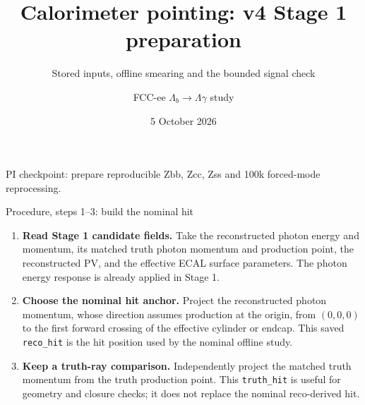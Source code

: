 \documentclass[aspectratio=169,10pt]{beamer}
\title[Photon pointing v4]{Calorimeter pointing: v4 Stage 1 preparation}
\subtitle{Stored inputs, offline smearing and the bounded signal check}
\author{FCC-ee $\Lambda_b\to\Lambda\gamma$ study}
\date{5 October 2026}
\begin{document}
\begin{frame}\titlepage
\vspace{-0.4cm}\centering\small PI checkpoint: prepare reproducible Zbb, Zcc, Zss and 100k forced-mode reprocessing.
\end{frame}

\begin{frame}{Procedure, steps 1--3: build the nominal hit}
\small
\begin{enumerate}
\item \textbf{Read Stage 1 candidate fields.} Take the reconstructed photon energy and momentum, its matched truth photon momentum and production point, the reconstructed PV, and the effective ECAL surface parameters. The photon energy response is already applied in Stage 1.
\item \textbf{Choose the nominal hit anchor.} Project the reconstructed photon momentum, whose direction assumes production at the origin, from $(0,0,0)$ to the first forward crossing of the effective cylinder or endcap. This saved \texttt{reco\_hit} is the hit position used by the nominal offline study.
\item \textbf{Keep a truth-ray comparison.} Independently project the matched truth momentum from the truth production point. This \texttt{truth\_hit} is useful for geometry and closure checks; it does not replace the nominal reco-derived hit.
\end{enumerate}
\vspace{0.15cm}
\begin{center}
\end{center}
\end{frame}
\end{document}
